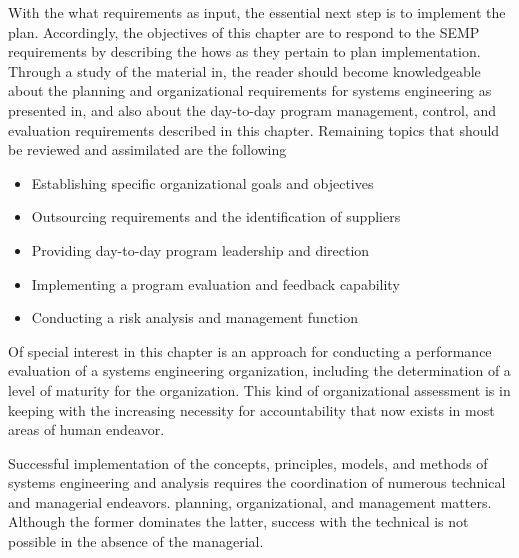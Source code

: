 With the what requirements as input, the essential next step is to implement the plan. Accordingly, the objectives of this chapter are to respond to the SEMP requirements by describing the hows as they pertain to plan implementation. Through a study of the material in, the reader should become knowledgeable about the planning and organizational requirements for systems engineering as presented in, and also about the day-to-day program management, control, and evaluation requirements described in this chapter. Remaining topics that should be reviewed and assimilated are the following

\begin{itemize}
\item Establishing specific organizational goals and objectives
\item Outsourcing requirements and the identification of suppliers
\item Providing day-to-day program leadership and direction
\item Implementing a program evaluation and feedback capability
\item Conducting a risk analysis and management function
\end{itemize}

Of special interest in this chapter is an approach for conducting a performance evaluation of a systems engineering organization, including the determination of a level of maturity for the organization. This kind of organizational assessment is in keeping with the increasing necessity for accountability that now exists in most areas of human endeavor.

Successful implementation of the concepts, principles, models, and methods of systems engineering and analysis requires the coordination of numerous technical and managerial endeavors. planning, organizational, and management matters. Although the former dominates the latter, success with the technical is not possible in the absence of the managerial.

